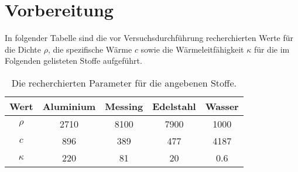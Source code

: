\section{Vorbereitung}
\label{sec:vorbereitung}
In folgender Tabelle sind die vor Versuchsdurchführung recherchierten Werte für
die Dichte $\rho$, die spezifische Wärme $c$ sowie die Wärmeleitfähigkeit $\kappa$
für die im Folgenden gelisteten Stoffe aufgeführt.

\begin{table}[H]
  \centering
  \caption{Die recherchierten Parameter für die angebenen Stoffe.}
  \label{tab:vorbereitung}
  \begin{tabular}{S S S[table-format=8.0] S S}
    \toprule
    {Wert}  & {Aluminium} & {Messing} & {Edelstahl} & {Wasser} \\
    \midrule
    $\rho   $ & 2710     & 8100       & 7900        & 1000  \\
    $c      $ & 896      & 389        & 477         & 4187  \\
    $\kappa $ & 220      & 81         & 20          & 0.6   \\
    \bottomrule
  \end{tabular}
\end{table}
